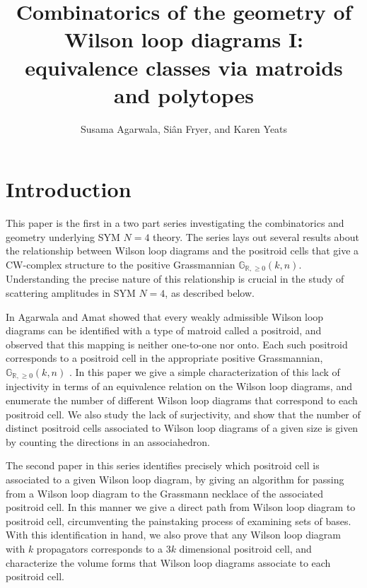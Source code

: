 \documentclass[11pt]{article}
\title{Combinatorics of the geometry of Wilson loop diagrams I: equivalence classes via matroids and polytopes}
\author{Susama Agarwala, Si\^an Fryer, and Karen Yeats}
\newcommand{\sanote}{\todo[color=violet!30]}
\newcommand{\R}{\mathbb{R}}
\newcommand{\Gr}{\mathbb{G}_{\R, \geq 0}}
\theoremstyle{remark}
\theoremstyle{definition}
\begin{document}
\maketitle



\section{Introduction}

This paper is the first in a two part series investigating the combinatorics and geometry underlying SYM $N=4$ theory. The series lays out several results about the relationship between Wilson loop diagrams and the positroid cells that give a CW-complex structure to the positive Grassmannian $\Gr(k,n)$. Understanding the precise nature of this relationship is crucial in the study of scattering amplitudes in SYM $N=4$, as described below.

In \cite{wilsonloop} Agarwala and Amat showed that every weakly admissible Wilson loop diagrams can be identified with a type of matroid called a positroid, and observed that this mapping is neither one-to-one nor onto. Each such positroid corresponds to a positroid cell in the appropriate positive Grassmannian, $\Gr(k,n)$ \cite{Postnikov}\sanote{Is this the right citation?}. In this paper we give a simple characterization of this lack of injectivity in terms of an equivalence relation on the Wilson loop diagrams, and enumerate the number of different Wilson loop diagrams that correspond to each positroid cell. We also study the lack of surjectivity, and show that the number of distinct positroid cells associated to Wilson loop diagrams of a given size is given by counting the directions in an associahedron. 

The second paper \cite{generalcombinatoricsII} in this series identifies precisely which positroid cell is associated to a given Wilson loop diagram, by giving an algorithm for passing from a Wilson loop diagram to the Grassmann necklace of the associated positroid cell. In this manner we give a direct path from Wilson loop diagram to positroid cell, circumventing the painstaking process of examining sets of bases. With this identification in hand, we also prove that any Wilson loop diagram with $k$ propagators corresponds to a $3k$ dimensional positroid cell, and characterize the volume forms that Wilson loop diagrams associate to each positroid cell.
\end{document}
